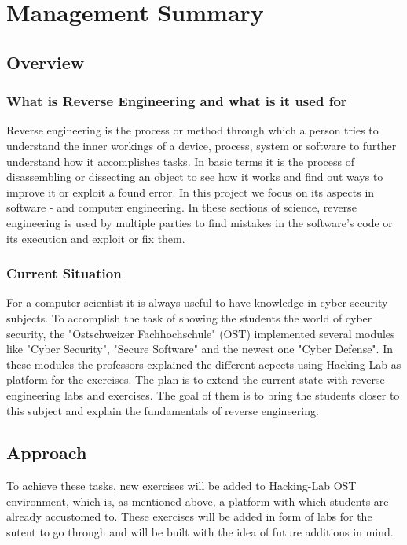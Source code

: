 \chapter{Management Summary}
\section{Overview}
\subsection{What is Reverse Engineering and what is it used for}
Reverse engineering is the process or method through which a person tries to understand the inner workings of a device, process, system or software to further understand how it accomplishes tasks. In basic terms it is the process of disassembling or dissecting an object to see how it works and find out ways to improve it or exploit a found error. In this project we focus on its aspects in software - and computer engineering. In these sections of science, reverse engineering is used by multiple parties to find mistakes in the software's code or its execution and exploit or fix them. 

\subsection{Current Situation}
For a computer scientist it is always useful to have knowledge in cyber security subjects. To accomplish the task of showing the students the world of cyber security, the "Ostschweizer Fachhochschule" (OST) implemented several modules like "Cyber Security", "Secure Software" and the newest one "Cyber Defense". In these modules the professors explained the different acpects using Hacking-Lab as platform for the exercises. The plan is to extend the current state with reverse engineering labs and exercises. The goal of them is to bring the students closer to this subject and explain the fundamentals of reverse engineering.

\section{Approach}
To achieve these tasks, new exercises will be added to Hacking-Lab OST environment, which is, as mentioned above, a platform with which students are already accustomed to. These exercises will be added in form of labs for the sutent to go through and will be built with the idea of future additions in mind.

